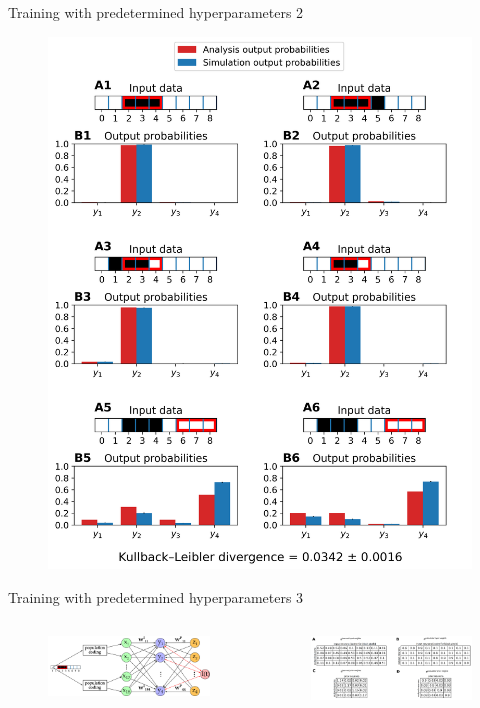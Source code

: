 \documentclass[aspectratio=169]{beamer}
\begin{document}
\begin{frame}{Training with predetermined hyperparameters 2}
 \vspace{-1.0cm}
		\begin{figure}
        \includegraphics[width=0.35\linewidth]{../Latex/figures/1D/training/trainingEvaluation_98_440_4_c3.png}
      \end{figure} 
\end{frame}

\begin{frame}{Training with predetermined hyperparameters 3}
 \vspace{-1.0cm}
   \begin{columns}
     \begin{column}{0.5\textwidth}
        \begin{figure}
        \includegraphics[width=1\linewidth]{../inkscape/networkPlanWeightComparison.png}
      \end{figure} 
     \end{column}
     \begin{column}{0.5\textwidth}
		\begin{figure}
        \includegraphics[width=1\linewidth]{../Latex/figures/1D/training/weightComparison.png}
      \end{figure} 
      \end{column}
    \end{columns}
\end{frame}
\end{document}
